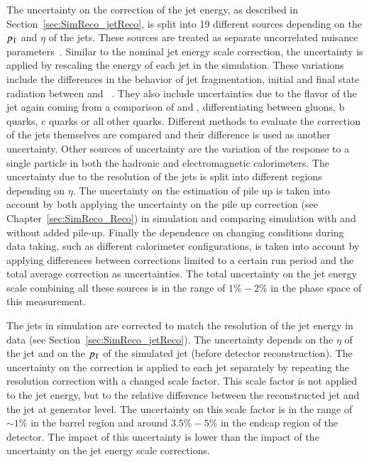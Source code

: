 The uncertainty on the correction of the jet energy, as described in Section~\ref{sec:SimReco_jetReco}, is split into 19 different sources depending on the $p_{\mathrm{T}}$ and $\eta$ of the jets.
These sources are treated as separate uncorrelated nuisance parameters~\cite{CMS-PAS-JME-16-003,Khachatryan:2016kdb}.
Similar to the nominal jet energy scale correction, the uncertainty is applied by rescaling the energy of each jet in the simulation.
These variations include the differences in the behavior of jet fragmentation, initial and final state radiation between  and \HERWIGPP~\cite{Sjostrand:2006za,herwigpp}.
They also include uncertainties due to the flavor of the jet again coming from a comparison of  and \HERWIGPP, differentiating between gluons, b quarks, c quarks or all other quarks.
Different methods to evaluate the correction of the jets themselves are compared and their difference is used as another uncertainty.
Other sources of uncertainty are the variation of the response to a single particle in both the hadronic and electromagnetic calorimeters.
The uncertainty due to the resolution of the jets is split into different regions depending on $\eta$.
The uncertainty on the estimation of pile up is taken into account by both applying the uncertainty on the pile up correction (see Chapter~\ref{sec:SimReco_Reco}) in simulation and comparing simulation with and without added pile-up.
Finally the dependence on changing conditions during data taking, such as different calorimeter configurations, is taken into account by applying differences between corrections limited to a certain run period and the total average correction as uncertainties.
The total uncertainty on the jet energy scale combining all these sources is in the range of $1\%  - 2\%$ in the phase space of this measurement.

The jets in simulation are corrected to match the resolution of the jet energy in data (see Section~\ref{sec:SimReco_jetReco}). The uncertainty depends on the $\eta$ of the jet and on
the $p_{\mathrm{T}}$ of the simulated jet (before detector reconstruction). 
The uncertainty on the correction is applied to each jet separately by repeating the resolution correction with a changed scale factor.
This scale factor is not applied to the jet energy, but to the relative difference between the reconstructed jet and the jet at generator level.
The uncertainty on this scale factor is in the range of $\sim 1\%$ in the barrel region and around $3.5\% - 5\%$ in the endcap region of the detector.
The impact of this uncertainty is lower than the impact 
of the uncertainty on the jet energy scale corrections.

